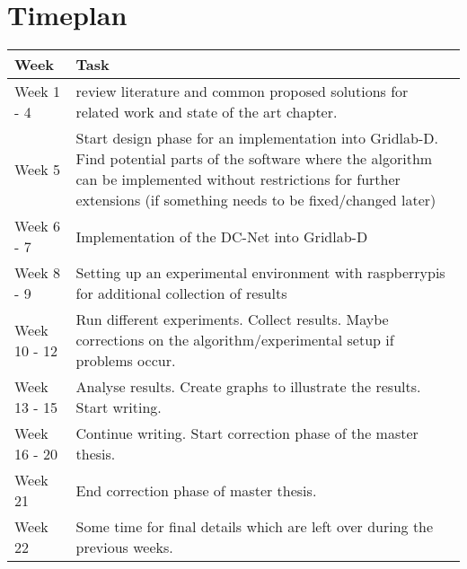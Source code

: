 \documentclass[english,sigconf,11pt]{acmart}
\begin{document}
\section{Timeplan}

\begin{table}[!htb]
\scriptsize
\centering
\begin{tabular}{|M{3,6cm}|M{3,6cm}|}
\hline 
Week & Task  \\ 
\hline 
Week 1 - 4 & review literature and common proposed solutions for related work and state of the art chapter.    \\ 
\hline 
Week 5 & Start design phase for an implementation into Gridlab-D. Find potential parts of the software where the algorithm can be implemented  without restrictions for further extensions (if something needs to be fixed/changed later)   \\ 
\hline 
Week 6 - 7  & Implementation of the DC-Net into Gridlab-D   \\ 
\hline 
Week 8 - 9 & Setting up an experimental environment with raspberrypis for additional collection of results\\ 
\hline 
Week 10 - 12 & Run different experiments. Collect results. Maybe corrections on the algorithm/experimental setup if problems occur. \\ 
\hline 
Week 13 - 15 & Analyse results. Create graphs to illustrate the results. Start writing. \\ 
\hline 
Week 16 - 20 & Continue writing. Start correction phase of the master thesis. \\ 
\hline 
Week 21 & End correction phase of master thesis. \\ 
\hline 
Week 22 & Some time for final details which are left over during the previous weeks. \\ 
\hline 
\end{tabular} 
\normalsize
\end{table}
 
\end{document}
